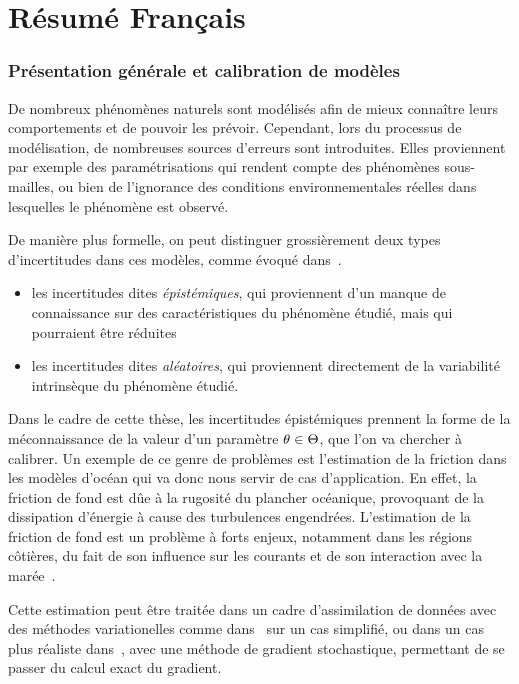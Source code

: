 \documentclass[../../Main_ManuscritThese.tex]{subfiles}
\begin{document}
\chapter*{Résumé Français}
\TitleBtwLines

{}
\label{chap:resume_fr}
\pagestyle{resumeStyle}

\subsection*{Présentation générale et calibration de modèles}
De nombreux phénomènes naturels sont modélisés afin de mieux connaître
leurs comportements et de pouvoir les prévoir.  Cependant, lors du
processus de modélisation, de nombreuses sources d'erreurs sont
introduites. Elles proviennent par exemple des paramétrisations qui
rendent compte des phénomènes sous-mailles, ou bien de l'ignorance des
conditions environnementales réelles dans lesquelles le phénomène est
observé.

De manière plus formelle, on peut distinguer grossièrement deux types d'incertitudes
dans ces modèles, comme évoqué dans~\cite{walker_defining_2003}.
\begin{itemize}
\item les incertitudes dites \emph{épistémiques}, qui proviennent d'un
  manque de connaissance sur des caractéristiques du phénomène
  étudié, mais qui pourraient être réduites
\item les incertitudes dites \emph{aléatoires}, qui proviennent
  directement de la variabilité intrinsèque du phénomène étudié.
\end{itemize}

Dans le cadre de cette thèse, les incertitudes épistémiques prennent
la forme de la méconnaissance de la valeur d'un paramètre
$\theta \in \Theta$, que l'on va chercher à calibrer. Un exemple de ce
genre de problèmes est l'estimation de la friction dans les modèles
d'océan qui va donc nous servir de cas d'application. En effet, la
friction de fond est dûe à la rugosité du plancher océanique,
provoquant de la dissipation d'énergie à cause des turbulences
engendrées. L'estimation de la friction de fond est un problème à
forts enjeux, notamment dans les régions côtières, du fait de son
influence sur les courants et de son interaction avec la
marée~\citep{sinha_principal_1997,boutet_estimation_2015}.

Cette estimation peut être traitée dans un cadre
d'assimilation de données avec des méthodes variationelles comme
dans~\cite{das_estimation_1991,das_variational_1992} sur un cas
simplifié, ou dans un cas plus réaliste
dans~\cite{boutet_estimation_2015}, avec une méthode de gradient
stochastique, permettant de se passer du calcul exact du gradient.
\end{document}
